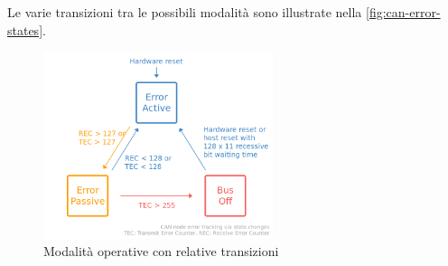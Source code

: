 Le varie transizioni tra le possibili modalità sono illustrate nella \autoref{fig:can-error-states}.
\begin{figure}[h]
    \centering
    \includegraphics[width=0.6\textwidth]{capitoli/figure-protocolli/CAN-error-states.png}
    \caption{Modalità operative con relative transizioni}
    \label{fig:can-error-states}
\end{figure}

